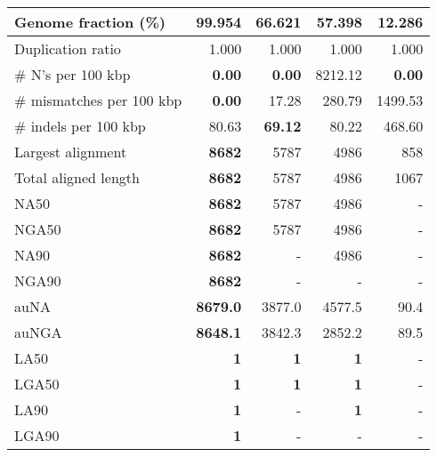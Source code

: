 \documentclass[12pt,a4paper]{article}
\begin{document}
\begin{table}[ht]
\begin{center}
\begin{tabular}{|l*{4}{|r}|}
Genome fraction (\%) & {\bf 99.954} & 66.621 & 57.398 & 12.286 \\ \hline
Duplication ratio & 1.000 & 1.000 & 1.000 & 1.000 \\ \hline
\# N's per 100 kbp & {\bf 0.00} & {\bf 0.00} & 8212.12 & {\bf 0.00} \\ \hline
\# mismatches per 100 kbp & {\bf 0.00} & 17.28 & 280.79 & 1499.53 \\ \hline
\# indels per 100 kbp & 80.63 & {\bf 69.12} & 80.22 & 468.60 \\ \hline
Largest alignment & {\bf 8682} & 5787 & 4986 & 858 \\ \hline
Total aligned length & {\bf 8682} & 5787 & 4986 & 1067 \\ \hline
NA50 & {\bf 8682} & 5787 & 4986 & - \\ \hline
NGA50 & {\bf 8682} & 5787 & 4986 & - \\ \hline
NA90 & {\bf 8682} & - & 4986 & - \\ \hline
NGA90 & {\bf 8682} & - & - & - \\ \hline
auNA & {\bf 8679.0} & 3877.0 & 4577.5 & 90.4 \\ \hline
auNGA & {\bf 8648.1} & 3842.3 & 2852.2 & 89.5 \\ \hline
LA50 & {\bf 1} & {\bf 1} & {\bf 1} & - \\ \hline
LGA50 & {\bf 1} & {\bf 1} & {\bf 1} & - \\ \hline
LA90 & {\bf 1} & - & {\bf 1} & - \\ \hline
LGA90 & {\bf 1} & - & - & - \\ \hline
\end{tabular}
\end{center}
\end{table}
\end{document}
